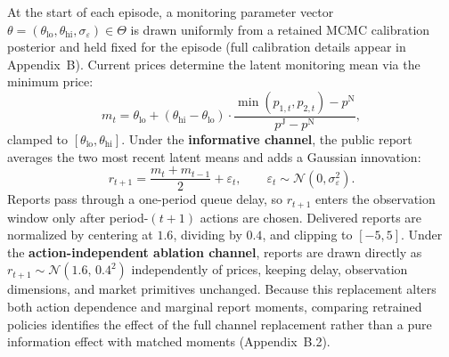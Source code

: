 At the start of each episode, a monitoring parameter vector $\theta=(\theta_{\mathrm{lo}},\theta_{\mathrm{hi}},\sigma_\varepsilon)\in\Theta$ is drawn uniformly from a retained MCMC calibration posterior and held fixed for the episode (full calibration details appear in Appendix~B). Current prices determine the latent monitoring mean via the minimum price:
\begin{equation}\label{eq:latent}
m_t = \theta_{\mathrm{lo}}
+ (\theta_{\mathrm{hi}}-\theta_{\mathrm{lo}})
\cdot \frac{\min(p_{1,t},p_{2,t})-p^{\mathrm{N}}}
{p^{\mathrm{J}}-p^{\mathrm{N}}},
\end{equation}
clamped to $[\theta_{\mathrm{lo}},\theta_{\mathrm{hi}}]$. Under the \textbf{informative channel}, the public report averages the two most recent latent means and adds a Gaussian innovation:
\begin{equation}\label{eq:report}
r_{t+1} = \frac{m_t + m_{t-1}}{2} + \varepsilon_t,\qquad
\varepsilon_t\sim\mathcal{N}(0,\sigma_\varepsilon^2).
\end{equation}
Reports pass through a one-period queue delay, so $r_{t+1}$ enters the observation window only after period-$(t+1)$ actions are chosen. Delivered reports are normalized by centering at $1.6$, dividing by $0.4$, and clipping to $[-5,5]$. Under the \textbf{action-independent ablation channel}, reports are drawn directly as $r_{t+1}\sim\mathcal{N}(1.6,\,0.4^2)$ independently of prices, keeping delay, observation dimensions, and market primitives unchanged. Because this replacement alters both action dependence and marginal report moments, comparing retrained policies identifies the effect of the full channel replacement rather than a pure information effect with matched moments (Appendix~B.2).


